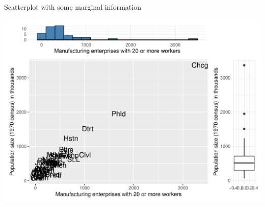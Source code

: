 \documentclass[11pt,handout,aspectratio=169]{beamer}
\begin{document}
\begin{frame}[fragile]{Scatterplot with some marginal information}
\begin{center}
\includegraphics[width=.75\textwidth]{pics/plot1.3.pdf}		
\end{center}
\end{frame}
\end{document}
